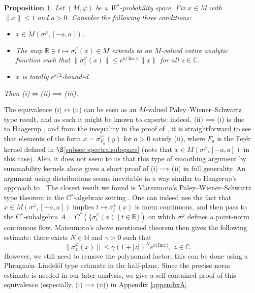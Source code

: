 \documentclass[12pt]{amsart}
\newtheorem{prop}[thm]{Proposition}
\theoremstyle{definition}
\newcommand{\C}{\mathbb{C}}
\newcommand{\N}{\mathbb{N}}
\begin{document}
\begin{prop}\label{prop compactspec}
Let $(M,\varphi)$ be a W$^*$-probability space. Fix $x\in M$ with $\|x\|\le 1$ and $a>0$. Consider the following three conditions: 
\begin{itemize}
    \item[{\rm (i)}] $x\in M(\sigma^{\varphi},[-a,a])$.
    \item[{\rm (ii)}] The map $\mathbb{R}\ni t\mapsto \sigma_t^{\varphi}(x)\in M$ extends to an $M$-valued entire analytic function such that 
    $\|\sigma_z^{\varphi}(x)\|\le e^{a|\operatorname{Im} z|}\|x\|$ for all $z\in \C$.
    \item[{\rm (iii)}] $x$ is totally $e^{a/2}$-bounded.  
\end{itemize}
Then (i)$\iff$(ii)$\implies$(iii). 
\end{prop}
The equivalence (i)$\iff$(ii) can be seen as an $M$-valued Paley--Wiener--Schwartz type result, and as such it might be known to experts: indeed, (ii)$\implies$(i) is due to Haagerup \cite[Lemma 2.5]{haagerup87}, and from the inequality in the proof of \cite[Lemma 4.2]{Haagerup79}, it is straightforward to see that elements of the form $x=\sigma_{F_a}^{\varphi}(y)$ for $a>0$ satisfy (ii), where $F_a$ is the Fej\'er kernel defined in $\S$\ref{subsec spectralsubspace} (note that $x\in M(\sigma^{\varphi},[-a,a])$ in this case). Also, it does not seem to us that this type of smoothing argument by summability kernels alone gives a short proof of (i)$\implies$(ii) in full generality. An argument using distributions seems inevitable in a way similar to Haagerup's approach to \cite[Lemma 2.5]{haagerup87}. The closest result we found is Matsumoto's Paley--Wiener--Schwartz type theorem in the C$^*$-algebraic setting \cite[Theorem 9.4]{Matsumoto1997}. One can indeed use the fact that $x\in M(\sigma^{\varphi},[-a,a])$ implies $t\mapsto \sigma_{t}^{\varphi}(x)$ is norm continuous, and then pass to the C$^*$-subalgebra $A=C^*(\{\sigma_t^{\varphi}(x)\mid t\in \mathbb R\})$ on which $\sigma^{\varphi}$ defines a point-norm continuous flow.  Matsumoto's above mentioned theorem then gives the following estimate: there exists $N\in \N$ and $\gamma>0$ such that 
\[\|\sigma_z^{\varphi}(x)\|\le \gamma(1+|z|)^Ne^{a|\,\mathrm{Im}z\,|},\,\,z\in \C.\]
However, we still need to remove the polynomial factor; this can be done using a Phragm\'en--Lindel\"of type estimate in the half-plane. Since the precise norm estimate is needed in our later analysis, we give a self-contained proof of this equivalence (especially, (i)$\implies$(ii)) in Appendix \ref{appendixA}.  
\end{document}
